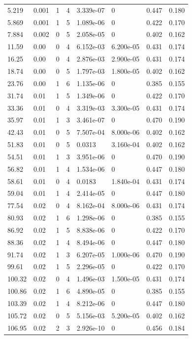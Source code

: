 \documentclass[preview]{standalone}
\begin{document}
{{\begin{tabular}{L{1.2cm}C{1.2cm} C{0.3cm}C{0.5cm} C{1.4cm}C{1.4cm} C{1.4cm}C{1.4cm}}
  5.219  &  0.001  & 1     &  4 &  3.339e-07  & 0  & 0.447 &  0.180   \\ 
  5.869  &  0.001  & 1     &  5 &  1.089e-06  & 0  & 0.422 &  0.170   \\ 
  7.884  &  0.002  & 0     &  5 &  2.058e-05  & 0  & 0.402 &  0.162   \\ 
  11.59  &  0.00  & 0     &  4 &  6.152e-03  & 6.200e-05  & 0.431 &  0.174   \\ 
  16.25  &  0.00  & 0     &  4 &  2.876e-03  & 2.900e-05  & 0.431 &  0.174   \\ 
  18.74  &  0.00  & 0     &  5 &  1.797e-03  & 1.800e-05  & 0.402 &  0.162   \\ 
  23.76  &  0.00  & 1     &  6 &  1.135e-06  & 0  & 0.385 &  0.155   \\ 
  31.74  &  0.01  & 1     &  5 &  1.349e-06  & 0  & 0.422 &  0.170   \\ 
  33.36  &  0.01  & 0     &  4 &  3.319e-03  & 3.300e-05  & 0.431 &  0.174   \\ 
  35.97  &  0.01  & 1     &  3 &  3.461e-07  & 0  & 0.470 &  0.190   \\ 
  42.43  &  0.01  & 0     &  5 &  7.507e-04  & 8.000e-06  & 0.402 &  0.162   \\ 
  51.83  &  0.01  & 0     &  5 &  0.0313  & 3.160e-04  & 0.402 &  0.162   \\ 
  54.51  &  0.01  & 1     &  3 &  3.951e-06  & 0  & 0.470 &  0.190   \\ 
  56.82  &  0.01  & 1     &  4 &  1.534e-06  & 0  & 0.447 &  0.180   \\ 
  58.61  &  0.01  & 0     &  4 &  0.0183  & 1.840e-04  & 0.431 &  0.174   \\ 
  59.04  &  0.01  & 1     &  4 &  2.414e-05  & 0  & 0.447 &  0.180   \\ 
  77.54  &  0.02  & 0     &  4 &  8.162e-04  & 8.000e-06  & 0.431 &  0.174   \\ 
  80.93  &  0.02  & 1     &  6 &  1.298e-06  & 0  & 0.385 &  0.155   \\ 
  86.92  &  0.02  & 1     &  5 &  8.838e-06  & 0  & 0.422 &  0.170   \\ 
  88.36  &  0.02  & 1     &  4 &  8.494e-06  & 0  & 0.447 &  0.180   \\ 
  91.74  &  0.02  & 1     &  3 &  6.207e-05  & 1.000e-06  & 0.470 &  0.190   \\ 
  99.61  &  0.02  & 1     &  5 &  2.296e-05  & 0  & 0.422 &  0.170   \\ 
  100.32  &  0.02  & 0     &  4 &  1.496e-03  & 1.500e-05  & 0.431 &  0.174   \\ 
  100.86  &  0.02  & 1     &  6 &  4.890e-05  & 0  & 0.385 &  0.155   \\ 
  103.39  &  0.02  & 1     &  4 &  8.212e-06  & 0  & 0.447 &  0.180   \\ 
  105.72  &  0.02  & 0     &  5 &  5.156e-03  & 5.200e-05  & 0.402 &  0.162   \\ 
  106.95  &  0.02  & 2     &  3 &  2.926e-10  & 0  & 0.456 &  0.184   \\ 
\hline 
\end{tabular} 

}}
\end{document}

